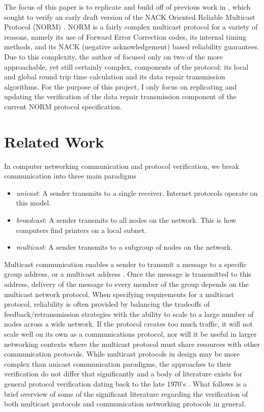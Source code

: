 \documentclass[10pt, journal]{IEEEtran}
\begin{document}
The focus of this paper is to replicate and build off of previous work in \cite{Lien2004}, which sought to verify an early draft version of the NACK Oriented Reliable Multicast Protocol (NORM) \cite{rfc5740}. NORM is a fairly complex multicast protocol for a variety of reasons, namely its use of Forward Error Correction codes, its internal timing methods, and its NACK (negative acknowledgement) based reliability guarantees. Due to this complexity, the author of \cite{Lien2004} focused only on two of the more approachable, yet still certainly complex, components of the protocol: its local and global round trip time calculation and its data repair transmission algorithms. For the purpose of this project, I only focus on replicating and updating the verification of the data repair transmission component of the current NORM protocol specification.

\section{Related Work}
In computer networking communication and protocol verification, we break communication into three main paradigms
\begin{itemize}
	\item \textit{unicast}: A sender transmits to a single receiver. Internet protocols operate on this model.
	\item \textit{broadcast}: A sender transmits to all nodes on the network. This is how computers find printers on a local subnet.
	\item \textit{multicast}: A sender transmits to a subgroup of nodes on the network.
\end{itemize}

Multicast communication enables a sender to transmit a message to a specific group address, or a multicast address \cite{Lien2004}. Once the message is transmitted to this address, delivery of the message to every member of the group depends on the multicast network protocol. When specifying requirements for a multicast protocol, reliability is often provided by balancing the tradeoffs of feedback/retransmission strategies with the ability to scale to a large number of nodes across a wide network. If the protocol creates too much traffic, it will not scale well on its own as a communications protocol, nor will it be useful in larger networking contexts where the multicast protocol must share resources with other communication protocols. While multicast protocols in design may be more complex than unicast communication paradigms, the approaches to their verification do not differ that significantly and a body of literature exists for general protocol verification dating back to the late 1970's \cite{Bochman1980}. What follows is a brief overview of some of the significant literature regarding the verification of both multicast protocols and communication networking protocols in general.
\end{document}
